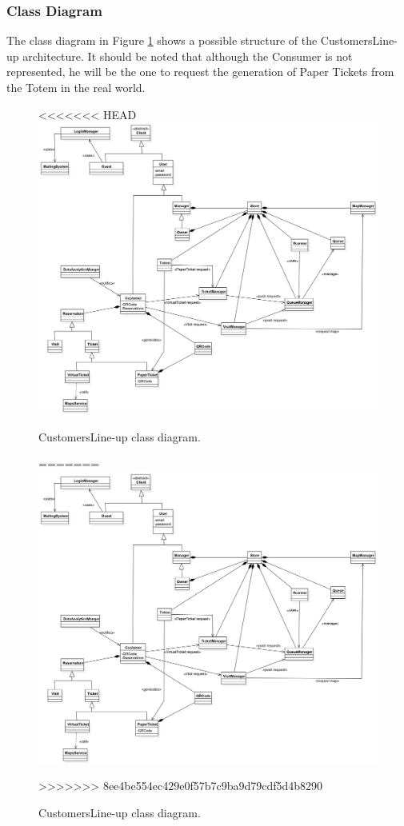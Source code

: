 \documentclass[a4paper, 12pt, oneside]{article}
\begin{document}
\subsubsection{Class Diagram}
The class diagram in Figure \ref{class_diagram} shows a possible structure of the CustomersLine-up architecture. It should be noted that although the Consumer is not represented, he will be the one to request the generation of Paper Tickets from the Totem in the real world.
\begin{figure}[h!]
\centering
<<<<<<< HEAD
    \centering
    \includegraphics[height=0.55\textheight, scale=0.2, keepaspectratio]{img/class_diagram.jpg}
    \caption{CustomersLine-up class diagram.}
    \label{class_diagram}
=======
	\centering
  	\includegraphics[height=0.55\textheight, scale=0.2, keepaspectratio]{img/class_diagram.jpg}
	\caption{CustomersLine-up class diagram.}
 	\label{class_diagram}
>>>>>>> 8ee4be554ec429e0f57b7c9ba9d79cdf5d4b8290
\end{figure}
\end{document}
